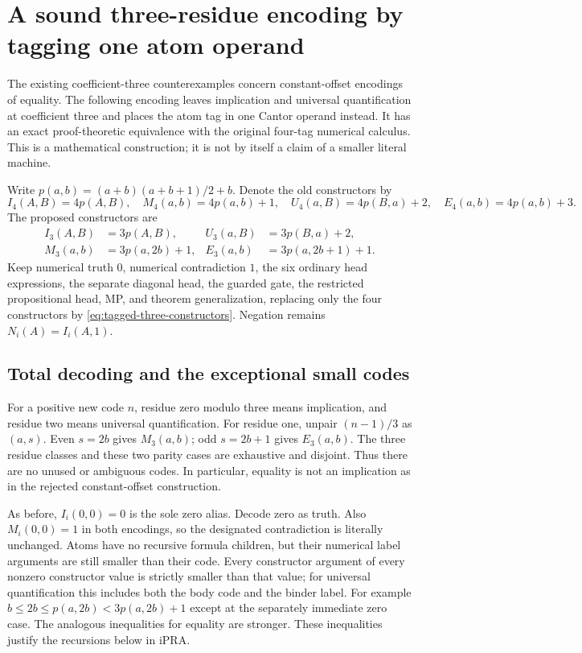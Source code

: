 \section{A sound three-residue encoding by tagging one atom operand}
\label{sec:tagged-three}

The existing coefficient-three counterexamples concern constant-offset
encodings of equality.  The following encoding leaves implication and
universal quantification at coefficient three and places the atom tag in
one Cantor operand instead.  It has an exact proof-theoretic equivalence
with the original four-tag numerical calculus.  This is a mathematical
construction; it is not by itself a claim of a smaller literal machine.

Write $p(a,b)=(a+b)(a+b+1)/2+b$.  Denote the old constructors by
\[
 I_4(A,B)=4p(A,B),\quad M_4(a,b)=4p(a,b)+1,\quad
 U_4(a,B)=4p(B,a)+2,\quad E_4(a,b)=4p(a,b)+3.
\]
The proposed constructors are
\[
\boxed{\begin{aligned}
 I_3(A,B)&=3p(A,B),& U_3(a,B)&=3p(B,a)+2,\\
 M_3(a,b)&=3p(a,2b)+1,& E_3(a,b)&=3p(a,2b+1)+1.
\end{aligned}}
\tag{T3}\label{eq:tagged-three-constructors}
\]
Keep numerical truth $0$, numerical contradiction $1$, the six ordinary
head expressions, the separate diagonal head, the guarded gate, the
restricted propositional head, MP, and theorem generalization, replacing
only the four constructors by \eqref{eq:tagged-three-constructors}.
Negation remains $N_i(A)=I_i(A,1)$.

\subsection{Total decoding and the exceptional small codes}

For a positive new code $n$, residue zero modulo three means implication,
and residue two means universal quantification.  For residue one, unpair
$(n-1)/3$ as $(a,s)$.  Even $s=2b$ gives $M_3(a,b)$; odd $s=2b+1$ gives
$E_3(a,b)$.  The three residue classes and these two parity cases are
exhaustive and disjoint.  Thus there are no unused or ambiguous codes.
In particular, equality is not an implication as in the rejected
constant-offset construction.

As before, $I_i(0,0)=0$ is the sole zero alias.  Decode zero as truth.
Also $M_i(0,0)=1$ in both encodings, so the designated contradiction is
literally unchanged.  Atoms have no recursive formula children, but their
numerical label arguments are still smaller than their code.  Every
constructor argument of every nonzero constructor value is strictly
smaller than that value; for universal quantification this includes both
the body code and the binder label.  For example
$b\le2b\le p(a,2b)<3p(a,2b)+1$ except at the separately immediate
zero case.  The analogous inequalities for equality are stronger.
These inequalities justify the recursions below in iPRA.

